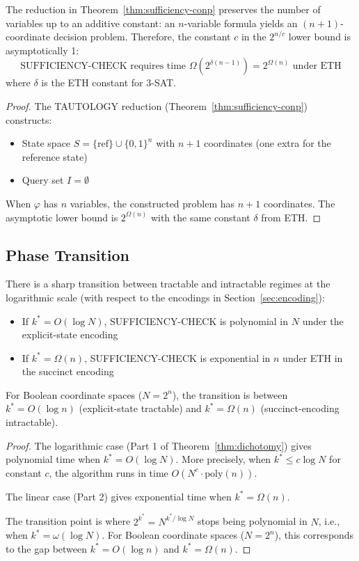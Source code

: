\begin{proposition}\label{prop:eth-constant}
The reduction in Theorem~\ref{thm:sufficiency-conp} preserves the number of variables up to an additive constant: an $n$-variable formula yields an $(n+1)$-coordinate decision problem. Therefore, the constant $c$ in the $2^{n/c}$ lower bound is asymptotically 1:
\[
\text{SUFFICIENCY-CHECK requires time } \Omega(2^{\delta (n-1)}) = 2^{\Omega(n)} \text{ under ETH}
\]
where $\delta$ is the ETH constant for 3-SAT.
\end{proposition}

\begin{proof}
The TAUTOLOGY reduction (Theorem~\ref{thm:sufficiency-conp}) constructs:
\begin{itemize}
\item State space $S = \{\text{ref}\} \cup \{0,1\}^n$ with $n+1$ coordinates (one extra for the reference state)
\item Query set $I = \emptyset$
\end{itemize}
When $\varphi$ has $n$ variables, the constructed problem has $n+1$ coordinates. The asymptotic lower bound is $2^{\Omega(n)}$ with the same constant $\delta$ from ETH.
\end{proof}

\subsection{Phase Transition}

\begin{corollary}\label{cor:phase-transition}
There is a sharp transition between tractable and intractable regimes at the logarithmic scale (with respect to the encodings in Section~\ref{sec:encoding}):
\begin{itemize}
\item If $k^* = O(\log N)$, SUFFICIENCY-CHECK is polynomial in $N$ under the explicit-state encoding
\item If $k^* = \Omega(n)$, SUFFICIENCY-CHECK is exponential in $n$ under ETH in the succinct encoding
\end{itemize}
For Boolean coordinate spaces ($N = 2^n$), the transition is between $k^* = O(\log n)$ (explicit-state tractable) and $k^* = \Omega(n)$ (succinct-encoding intractable).
\end{corollary}

\begin{proof}
The logarithmic case (Part 1 of Theorem~\ref{thm:dichotomy}) gives polynomial time when $k^* = O(\log N)$. More precisely, when $k^* \leq c \log N$ for constant $c$, the algorithm runs in time $O(N^c \cdot \text{poly}(n))$.

The linear case (Part 2) gives exponential time when $k^* = \Omega(n)$.

The transition point is where $2^{k^*} = N^{k^*/\log N}$ stops being polynomial in $N$, i.e., when $k^* = \omega(\log N)$. For Boolean coordinate spaces ($N = 2^n$), this corresponds to the gap between $k^* = O(\log n)$ and $k^* = \Omega(n)$.
\end{proof}


